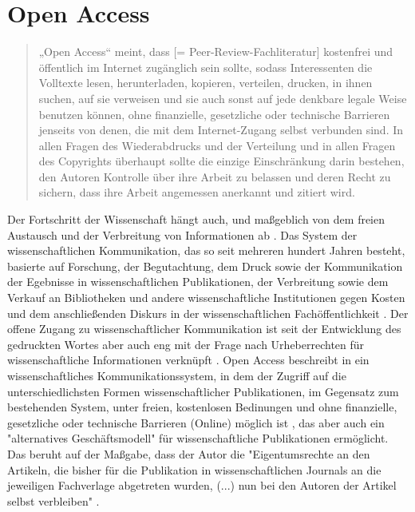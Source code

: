 \section{Open Access} 

\begin{quote}
„Open Access“ meint, dass [= Peer-Review-Fachliteratur] kostenfrei und öffentlich im Internet zugänglich sein sollte, sodass Interessenten die Volltexte lesen, herunterladen, kopieren, verteilen, drucken, in ihnen suchen, auf sie verweisen und sie auch sonst auf jede denkbare legale Weise benutzen können, ohne finanzielle, gesetzliche oder technische Barrieren jenseits von denen, die mit dem Internet-Zugang selbst verbunden sind. In allen Fragen des Wiederabdrucks und der Verteilung und in allen Fragen des Copyrights überhaupt sollte die einzige Einschränkung darin bestehen, den Autoren Kontrolle über ihre Arbeit zu belassen und deren Recht zu sichern, dass ihre Arbeit angemessen anerkannt und zitiert wird.
\cite{boai_2012}
\end{quote}
Der Fortschritt der Wissenschaft hängt auch, und maßgeblich von dem freien Austausch und der Verbreitung von Informationen ab \cite{cite:11}. Das System der wissenschaftlichen Kommunikation, das so seit mehreren hundert Jahren besteht, basierte auf Forschung, der Begutachtung, dem Druck sowie der Kommunikation der Egebnisse in wissenschaftlichen Publikationen, der Verbreitung sowie dem Verkauf an Bibliotheken und andere wissenschaftliche Institutionen gegen Kosten \cite{cite:11a} und dem anschließenden Diskurs in der wissenschaftlichen Fachöffentlichkeit \cite{suchen}. Der offene Zugang zu wissenschaftlicher Kommunikation ist seit der Entwicklung des gedruckten Wortes aber auch eng mit der Frage nach Urheberrechten für wissenschaftliche Informationen verknüpft \cite{Case_2000}. Open Access beschreibt in ein wissenschaftliches Kommunikationssystem, in dem der Zugriff auf die unterschiedlichsten Formen wissenschaftlicher Publikationen, im Gegensatz zum bestehenden System, unter freien, kostenlosen Bedinungen und ohne finanzielle, gesetzliche oder technische Barrieren (Online) möglich ist \cite{WD_bundestag_2009}, das aber auch ein "alternatives Geschäftsmodell"\cite{lewis_2012_inevitability} für wissenschaftliche Publikationen ermöglicht. Das beruht auf der Maßgabe, dass der Autor die "Eigentumsrechte an den Artikeln, die bisher für die Publikation in wissenschaftlichen Journals an die jeweiligen Fachverlage abgetreten wurden, (...) nun bei den Autoren der Artikel selbst verbleiben" \cite{Hess_2006}. 

